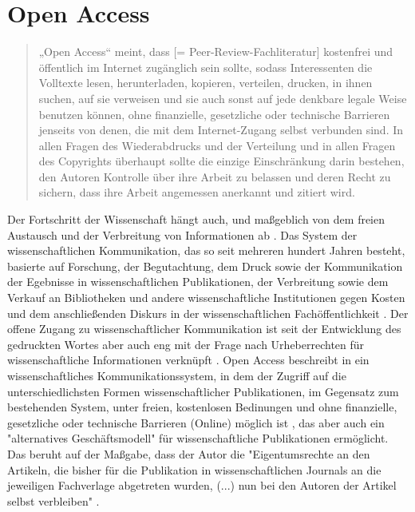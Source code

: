 \section{Open Access} 

\begin{quote}
„Open Access“ meint, dass [= Peer-Review-Fachliteratur] kostenfrei und öffentlich im Internet zugänglich sein sollte, sodass Interessenten die Volltexte lesen, herunterladen, kopieren, verteilen, drucken, in ihnen suchen, auf sie verweisen und sie auch sonst auf jede denkbare legale Weise benutzen können, ohne finanzielle, gesetzliche oder technische Barrieren jenseits von denen, die mit dem Internet-Zugang selbst verbunden sind. In allen Fragen des Wiederabdrucks und der Verteilung und in allen Fragen des Copyrights überhaupt sollte die einzige Einschränkung darin bestehen, den Autoren Kontrolle über ihre Arbeit zu belassen und deren Recht zu sichern, dass ihre Arbeit angemessen anerkannt und zitiert wird.
\cite{boai_2012}
\end{quote}
Der Fortschritt der Wissenschaft hängt auch, und maßgeblich von dem freien Austausch und der Verbreitung von Informationen ab \cite{cite:11}. Das System der wissenschaftlichen Kommunikation, das so seit mehreren hundert Jahren besteht, basierte auf Forschung, der Begutachtung, dem Druck sowie der Kommunikation der Egebnisse in wissenschaftlichen Publikationen, der Verbreitung sowie dem Verkauf an Bibliotheken und andere wissenschaftliche Institutionen gegen Kosten \cite{cite:11a} und dem anschließenden Diskurs in der wissenschaftlichen Fachöffentlichkeit \cite{suchen}. Der offene Zugang zu wissenschaftlicher Kommunikation ist seit der Entwicklung des gedruckten Wortes aber auch eng mit der Frage nach Urheberrechten für wissenschaftliche Informationen verknüpft \cite{Case_2000}. Open Access beschreibt in ein wissenschaftliches Kommunikationssystem, in dem der Zugriff auf die unterschiedlichsten Formen wissenschaftlicher Publikationen, im Gegensatz zum bestehenden System, unter freien, kostenlosen Bedinungen und ohne finanzielle, gesetzliche oder technische Barrieren (Online) möglich ist \cite{WD_bundestag_2009}, das aber auch ein "alternatives Geschäftsmodell"\cite{lewis_2012_inevitability} für wissenschaftliche Publikationen ermöglicht. Das beruht auf der Maßgabe, dass der Autor die "Eigentumsrechte an den Artikeln, die bisher für die Publikation in wissenschaftlichen Journals an die jeweiligen Fachverlage abgetreten wurden, (...) nun bei den Autoren der Artikel selbst verbleiben" \cite{Hess_2006}. 

